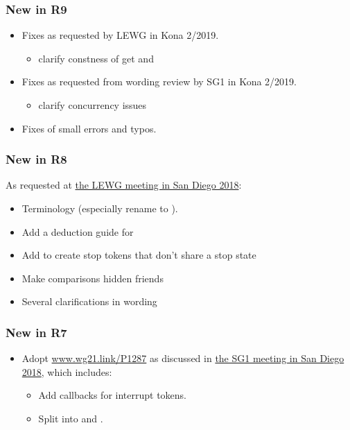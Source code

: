 \subsubsection*{New in R9}
\begin{itemize}
 \item Fixes as requested by LEWG in Kona 2/2019.
        \begin{itemize}
         \item clarify constness of get  and 
        \end{itemize}
 \item Fixes as requested from wording review by SG1 in Kona 2/2019.
        \begin{itemize}
         \item clarify concurrency issues
        \end{itemize}
 \item Fixes of small errors and typos.
\end{itemize}

\subsubsection*{New in R8}
As requested at
\href{http://wiki.edg.com/bin/view/Wg21sandiego2018/P0660}{the LEWG meeting in San Diego 2018}:
\begin{itemize}
 \item Terminology (especially rename  to ).
 \item Add a deduction guide for 
 \item Add  to create stop tokens that don't share a stop state
 \item Make comparisons hidden friends
 \item Several clarifications in wording
\end{itemize}

\subsubsection*{New in R7}
\begin{itemize}
 \item Adopt \url{www.wg21.link/P1287} as discussed in
        \href{http://wiki.edg.com/bin/view/Wg21sandiego2018/P1287R0}{the SG1 meeting in San Diego 2018},
        which includes:
        \begin{itemize}
         \item Add callbacks for interrupt tokens.
         \item Split into  and .
        \end{itemize}
\end{itemize}

